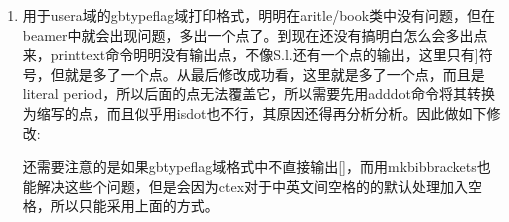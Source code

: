 \begin{enumerate}
\item 用于usera域的gbtypeflag域打印格式，明明在aritle/book类中没有问题，但在beamer中就会出现问题，多出一个点了。到现在还没有搞明白怎么会多出点来，printtext命令明明没有输出点，不像S.l.还有一个点的输出，这里只有]符号，但就是多了一个点。从最后修改成功看，这里就是多了一个点，而且是literal period，所以后面的点无法覆盖它，所以需要先用adddot命令将其转换为缩写的点，而且似乎用isdot也不行，其原因还得再分析分析。因此做如下修改:

\begin{texlist}
%

\end{texlist}

还需要注意的是如果gbtypeflag域格式中不直接输出[]，而用mkbibbrackets也能解决这些个问题，但是会因为ctex对于中英文间空格的的默认处理加入空格，所以只能采用上面的方式。


\end{enumerate}
